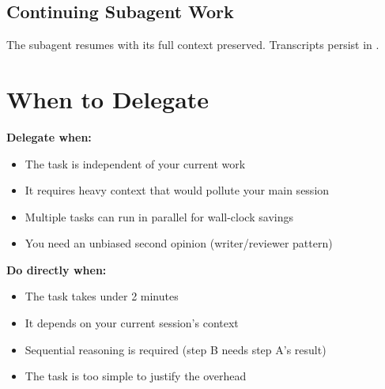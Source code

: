 \subsection{Continuing Subagent Work}

The subagent resumes with its full context preserved.
Transcripts persist in .


\section{When to Delegate}
\label{sec:delegation-decision}

\begin{decisionbox}
\textbf{Delegate when:}
\begin{itemize}
  \item The task is independent of your current work
  \item It requires heavy context that would pollute your main session
  \item Multiple tasks can run in parallel for wall-clock savings
  \item You need an unbiased second opinion (writer/reviewer pattern)
\end{itemize}

\textbf{Do directly when:}
\begin{itemize}
  \item The task takes under 2 minutes
  \item It depends on your current session's context
  \item Sequential reasoning is required (step B needs step A's result)
  \item The task is too simple to justify the overhead
\end{itemize}
\end{decisionbox}


